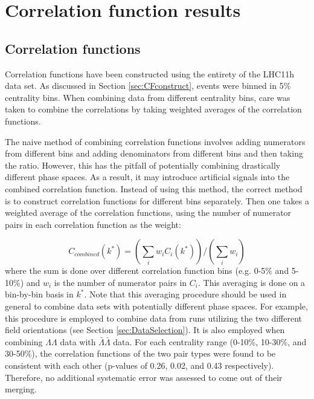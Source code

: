 \section{Correlation function results}
\subsection{Correlation functions}
\label{sec:CorrelationFunctions}

Correlation functions have been constructed using the entirety of the LHC11h data set.  As discussed in Section \ref{sec:CFconstruct}, events were binned in 5\% centrality bins.  When combining data from different centrality bins, care was taken to combine the correlations by taking weighted averages of the correlation functions.  

The naive method of combining correlation functions involves adding numerators from different bins and adding denominators from different bins and then taking the ratio.  However, this has the pitfall of potentially combining drastically different phase spaces.  As a result, it may introduce artificial signals into the combined correlation function.  Instead of using this method, the correct method is to construct correlation functions for different bins separately.  Then one takes a weighted average of the correlation functions, using the number of numerator pairs in each correlation function as the weight:

\begin{equation}
\label{eq:CombineCF}
C_{combined}(k^*) = (\displaystyle\sum\limits_{i} w_i C_i(k^*))/(\displaystyle\sum\limits_{i} w_i)
\end{equation}
where the sum is done over different correlation function bins (e.g. 0-5\% and 5-10\%) and $w_i$ is the number of numerator pairs in $C_i$.  This averaging is done on a bin-by-bin basis in $k^*$.  Note that this averaging procedure should be used in general to combine data sets with potentially different phase spaces. For example, this procedure is employed to combine data from runs utilizing the two different field orientations (see Section \ref{sec:DataSelection}).  It is also employed when combining $\Lambda\Lambda$ data with $\bar{\Lambda}\bar{\Lambda}$ data.  For each centrality range (0-10\%, 10-30\%, and 30-50\%), the correlation functions of the two pair types were found to be consistent with each other (p-values of 0.26, 0.02, and 0.43 respectively).  Therefore, no additional systematic error was assessed to come out of their merging.


